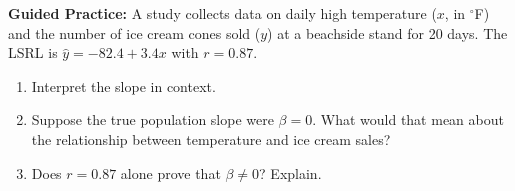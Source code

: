\documentclass[10pt]{article}
\begin{document}
\begin{practicebox}
\textbf{Guided Practice:} A study collects data on daily high temperature ($x$, in $^\circ$F)
and the number of ice cream cones sold ($y$) at a beachside stand for 20 days. The LSRL is
$\hat{y} = -82.4 + 3.4x$ with $r = 0.87$.

\begin{enumerate}
  \item Interpret the slope in context.
        \\

  \item Suppose the true population slope were $\beta = 0$. What would that mean
        about the relationship between temperature and ice cream sales?
        \\

  \item Does $r = 0.87$ alone prove that $\beta \ne 0$? Explain.
        \\
\end{enumerate}
\end{practicebox}
\end{document}
